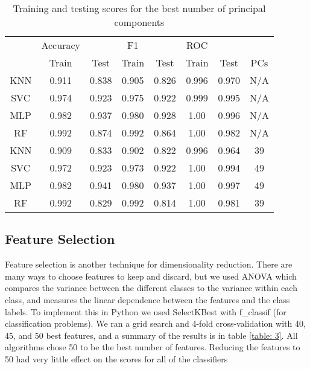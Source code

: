 \documentclass[12pt]{article}
\begin{document}
\begin{table}[h!]
	\centering
	\begin{tabular}{| c|cc| cc| cc|c|} 
		\hline
			&Accuracy&&F1&&ROC&&\\
			& Train & Test & Train & Test & Train & Test & PCs\\ \hline
		KNN & 0.911 & 0.838 & 0.905 & 0.826 & 0.996& 0.970& N/A\\ 
		SVC & 0.974 & 0.923 & 0.975 & 0.922 & 0.999 & 0.995& N/A\\ 
		MLP & 0.982 & 0.937 & 0.980 & 0.928 & 1.00 & 0.996& N/A\\
		RF  & 0.992 & 0.874 & 0.992 & 0.864 & 1.00 & 0.982& N/A\\
		\hline
		KNN & 0.909 & 0.833 & 0.902 & 0.822 & 0.996& 0.964& 39\\ 
		SVC & 0.972 & 0.923 & 0.973 & 0.922 & 1.00 & 0.994& 49\\ 
		MLP & 0.982 & 0.941 & 0.980 & 0.937 & 1.00 & 0.997& 49\\
		RF  & 0.992 & 0.829 & 0.992 & 0.814 & 1.00 & 0.981& 39\\
		\hline
	\end{tabular}
	\caption{Training and testing scores for the best number of principal components}
	\label{table: 2}
\end{table}
\FloatBarrier

\subsection{Feature Selection}
Feature selection is another technique for dimensionality reduction. There are many ways to choose features to keep and discard, but we used ANOVA which compares the variance between the different classes to the variance within each class, and measures the linear dependence between the features and the class labels. To implement this in Python we used SelectKBest with f\_classif (for classification problems). We ran a grid search and 4-fold cross-validation with 40, 45, and 50 best features, and a summary of the results is in table \ref{table: 3}. All algorithms chose 50 to be the best number of features. Reducing the features to 50 had very little effect on the scores for all of the classifiers
 
\end{document}
